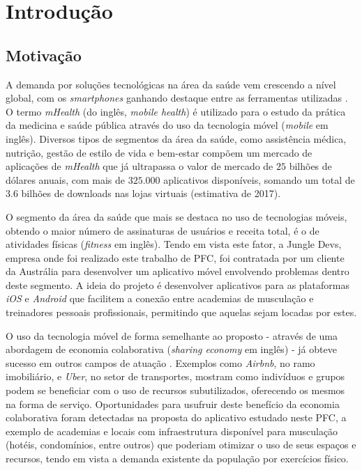 \chapter{Introdução}

\section{Motivação}

A demanda por soluções tecnológicas na área da saúde vem crescendo a nível global, com os  \textit{smartphones} ganhando destaque entre as ferramentas utilizadas . O termo \textit{mHealth} (do inglês, \textit{mobile health}) é utilizado para o estudo da prática da medicina e saúde pública através do uso da tecnologia móvel (\textit{mobile} em inglês). Diversos tipos de segmentos da área da saúde, como assistência médica, nutrição, gestão de estilo de vida e bem-estar compõem um mercado de aplicações de \textit{mHealth} que já ultrapassa o valor de mercado de $25$ bilhões de dólares anuais, com mais de $325.000$ aplicativos disponíveis, somando um total de $3.6$ bilhões de downloads nas lojas virtuais (estimativa de 2017).

O segmento da área da saúde que mais se destaca no uso de tecnologias móveis, obtendo o maior número de assinaturas de usuários e receita total, é o de atividades físicas (\textit{fitness} em inglês). Tendo em vista este fator, a Jungle Devs, empresa onde foi realizado este trabalho de PFC, foi contratada por um cliente da Austrália para desenvolver um aplicativo móvel envolvendo problemas dentro deste segmento. A ideia do projeto é desenvolver aplicativos para as plataformas \textit{iOS} e \textit{Android} que facilitem a conexão entre academias de musculação e treinadores pessoais profissionais, permitindo que aquelas sejam locadas por estes.

O uso da tecnologia móvel de forma semelhante ao proposto - através de uma abordagem de economia colaborativa (\textit{sharing economy} em inglês) - já obteve sucesso em outros campos de atuação . Exemplos como \textit{Airbnb}, no ramo imobiliário, e \textit{Uber}, no setor de transportes, mostram como indivíduos e grupos podem se beneficiar com o uso de recursos subutilizados, oferecendo os mesmos na forma de serviço. Oportunidades para usufruir deste benefício da economia colaborativa foram detectadas na proposta do aplicativo estudado neste PFC, a exemplo de academias e locais com infraestrutura disponível para musculação (hotéis, condomínios, entre outros) que poderiam otimizar o uso de seus espaços e recursos, tendo em vista a demanda existente da população por exercícios físico.

